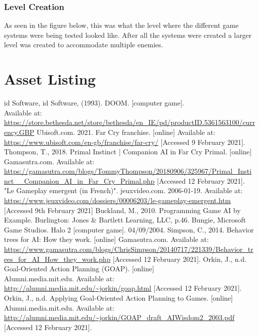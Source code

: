 \documentclass[12pt]{report}
\begin{document}
\subsection{Level Creation}
As seen in the figure below, this was what the level where the different game systems were being tested looked like. After all the systems were created a larger level was created to accommodate multiple enemies.


\chapter{Asset Listing}

\begin{thebibliography}{}
    id Software, id Software, (1993). DOOM. [computer game]. \\Available at: \url{https://store.bethesda.net/store/bethesda/en_IE/pd/productID.5361563100/currency.GBP}
    Ubisoft.com. 2021. Far Cry franchise. [online] Available at: \url{https://www.ubisoft.com/en-gb/franchise/far-cry/} [Accessed 9 February 2021].
    Thompson, T., 2018. Primal Instinct | Companion AI in Far Cry Primal. [online] Gamasutra.com. Available at: \url{https://gamasutra.com/blogs/TommyThompson/20180906/325967/Primal_Instinct__Companion_AI_in_Far_Cry_Primal.php} [Accessed 12 February 2021].
    "Le Gameplay emergent (in French)". jeuxvideo.com. 2006-01-19. Available at: \url{https://www.jeuxvideo.com/dossiers/00006203/le-gameplay-emergent.htm} [Accessed 9th February 2021]
    Buckland, M., 2010. Programming Game AI by Example. Burlington: Jones \& Bartlett Learning, LLC, p.46.
    Bungie, Microsoft Game Studios. Halo 2 [computer game]. 04/09/2004.
    Simpson, C., 2014. Behavior trees for AI: How they work. [online] Gamasutra.com. Available at: \url{https://www.gamasutra.com/blogs/ChrisSimpson/20140717/221339/Behavior_trees_for_AI_How_they_work.php} [Accessed 12 February 2021].
    Orkin, J., n.d. Goal-Oriented Action Planning (GOAP). [online] \\Alumni.media.mit.edu. Available at: \url{http://alumni.media.mit.edu/~jorkin/goap.html} [Accessed 12 February 2021].
    Orkin, J., n.d. Applying Goal-Oriented Action Planning to Games. [online] \\Alumni.media.mit.edu. Available at: \url{http://alumni.media.mit.edu/~jorkin/GOAP_draft_AIWisdom2_2003.pdf} [Accessed 12 February 2021].

\end{thebibliography}
\end{document}
